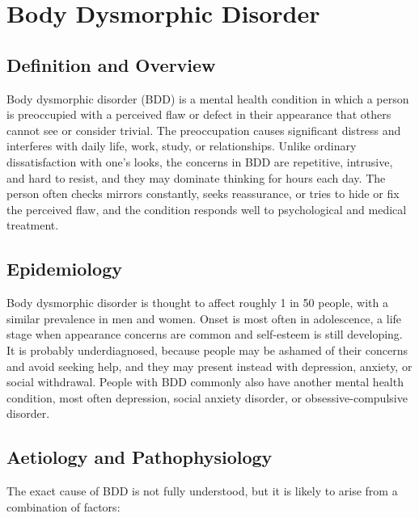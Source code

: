 \chapter{Body Dysmorphic Disorder}

\section*{Definition and Overview}
Body dysmorphic disorder (BDD) is a mental health condition in which a person is preoccupied with a perceived flaw or defect in their appearance that others cannot see or consider trivial. The preoccupation causes significant distress and interferes with daily life, work, study, or relationships. Unlike ordinary dissatisfaction with one's looks, the concerns in BDD are repetitive, intrusive, and hard to resist, and they may dominate thinking for hours each day. The person often checks mirrors constantly, seeks reassurance, or tries to hide or fix the perceived flaw, and the condition responds well to psychological and medical treatment.

\section*{Epidemiology}
Body dysmorphic disorder is thought to affect roughly 1 in 50 people, with a similar prevalence in men and women. Onset is most often in adolescence, a life stage when appearance concerns are common and self-esteem is still developing. It is probably underdiagnosed, because people may be ashamed of their concerns and avoid seeking help, and they may present instead with depression, anxiety, or social withdrawal. People with BDD commonly also have another mental health condition, most often depression, social anxiety disorder, or obsessive-compulsive disorder.

\section*{Aetiology and Pathophysiology}
The exact cause of BDD is not fully understood, but it is likely to arise from a combination of factors:

